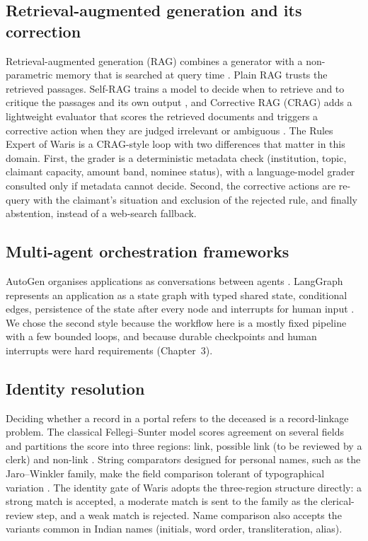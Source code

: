 \documentclass[12pt,a4paper,oneside]{report}
\begin{document}
\subsection{Retrieval-augmented generation and its correction}
Retrieval-augmented generation (RAG) combines a generator with a non-parametric memory that is searched at query time \cite{lewis2020rag}. Plain RAG trusts the retrieved passages. Self-RAG trains a model to decide when to retrieve and to critique the passages and its own output \cite{asai2024selfrag}, and Corrective RAG (CRAG) adds a lightweight evaluator that scores the retrieved documents and triggers a corrective action when they are judged irrelevant or ambiguous \cite{yan2024crag}. The Rules Expert of Waris is a CRAG-style loop with two differences that matter in this domain. First, the grader is a deterministic metadata check (institution, topic, claimant capacity, amount band, nominee status), with a language-model grader consulted only if metadata cannot decide. Second, the corrective actions are re-query with the claimant's situation and exclusion of the rejected rule, and finally abstention, instead of a web-search fallback.

\subsection{Multi-agent orchestration frameworks}
AutoGen organises applications as conversations between agents \cite{wu2023autogen}. LangGraph represents an application as a state graph with typed shared state, conditional edges, persistence of the state after every node and interrupts for human input \cite{langgraph}. We chose the second style because the workflow here is a mostly fixed pipeline with a few bounded loops, and because durable checkpoints and human interrupts were hard requirements (Chapter~3).

\subsection{Identity resolution}\label{sec:linkage}
Deciding whether a record in a portal refers to the deceased is a record-linkage problem. The classical Fellegi--Sunter model scores agreement on several fields and partitions the score into three regions: link, possible link (to be reviewed by a clerk) and non-link \cite{fellegi1969}. String comparators designed for personal names, such as the Jaro--Winkler family, make the field comparison tolerant of typographical variation \cite{winkler1990}. The identity gate of Waris adopts the three-region structure directly: a strong match is accepted, a moderate match is sent to the family as the clerical-review step, and a weak match is rejected. Name comparison also accepts the variants common in Indian names (initials, word order, transliteration, alias).
\end{document}

